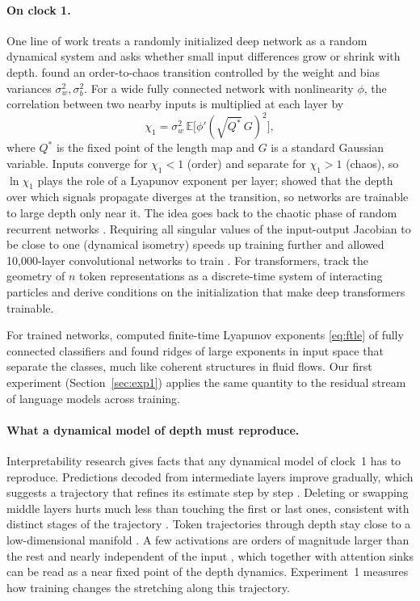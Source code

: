 \paragraph{On clock 1.} One line of work treats a randomly initialized deep network as a random dynamical system and asks whether small input differences grow or shrink with depth. \citet{poole2016exponential} found an order-to-chaos transition controlled by the weight and bias variances $\sigma_w^2,\sigma_b^2$. For a wide fully connected network with nonlinearity $\phi$, the correlation between two nearby inputs is multiplied at each layer by
\begin{equation}
\chi_1=\sigma_w^2\,\mathbb{E}\big[\phi'(\sqrt{Q^\ast}\,G)^2\big] ,
\label{eq:chi1}
\end{equation}
where $Q^\ast$ is the fixed point of the length map and $G$ is a standard Gaussian variable. Inputs converge for $\chi_1<1$ (order) and separate for $\chi_1>1$ (chaos), so $\ln\chi_1$ plays the role of a Lyapunov exponent per layer; \citet{schoenholz2016deep} showed that the depth over which signals propagate diverges at the transition, so networks are trainable to large depth only near it. The idea goes back to the chaotic phase of random recurrent networks \citep{sompolinsky1988chaos}. Requiring all singular values of the input-output Jacobian to be close to one (dynamical isometry) speeds up training further \citep{pennington2017resurrecting} and allowed 10{,}000-layer convolutional networks to train \citep{xiao2018dynamical}. For transformers, \citet{cowsik2024geometric} track the geometry of $n$ token representations as a discrete-time system of interacting particles and derive conditions on the initialization that make deep transformers trainable.

For trained networks, \citet{storm2023finitetime} computed finite-time Lyapunov exponents \eqref{eq:ftle} of fully connected classifiers and found ridges of large exponents in input space that separate the classes, much like coherent structures in fluid flows. Our first experiment (Section~\ref{sec:exp1}) applies the same quantity to the residual stream of language models across training.

\paragraph{What a dynamical model of depth must reproduce.} Interpretability research gives facts that any dynamical model of clock~1 has to reproduce. Predictions decoded from intermediate layers improve gradually, which suggests a trajectory that refines its estimate step by step \citep{belrose2023eliciting}. Deleting or swapping middle layers hurts much less than touching the first or last ones, consistent with distinct stages of the trajectory \citep{lad2024remarkable}. Token trajectories through depth stay close to a low-dimensional manifold \citep{sarfati2024lines}. A few activations are orders of magnitude larger than the rest and nearly independent of the input \citep{sun2024massive}, which together with attention sinks \citep{xiao2023efficient} can be read as a near fixed point of the depth dynamics. Experiment~1 measures how training changes the stretching along this trajectory.

